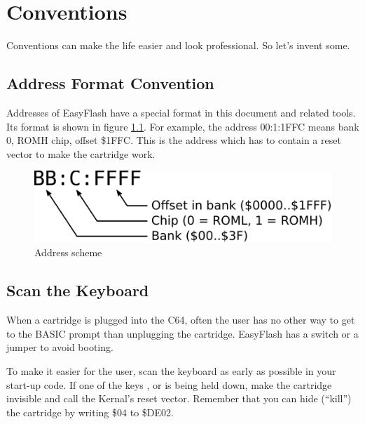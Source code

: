 \documentclass[a4paper,oneside]{memoir}
\begin{document}
\chapter{Conventions}

Conventions can make the life easier and look professional. So let's invent some.

\section{Address Format Convention}
Addresses of EasyFlash have a special format in this document and related tools. Its format is shown in figure \ref{fig:address-scheme}.
For example, the address 00:1:1FFC means bank 0, ROMH chip, offset \$1FFC. This is the address which has to contain a reset vector to make the cartridge work.

\begin{figure}[!htbp]
    \centering
    \includegraphics[scale=0.75]{src/address-scheme.pdf}
    \caption{Address scheme}
    \label{fig:address-scheme}
\end{figure}

\section{Scan the Keyboard}

When a cartridge is plugged into the C64, often the user has no other way to get to the BASIC prompt than unplugging the cartridge. EasyFlash has a switch or a jumper to avoid booting.

To make it easier for the user, scan the keyboard as early as possible in your start-up code. If one of the keys ,  or  is being held down, make the cartridge invisible and call the Kernal's reset vector. Remember that you can hide (“kill”) the cartridge by writing \$04 to \$DE02.
\end{document}

